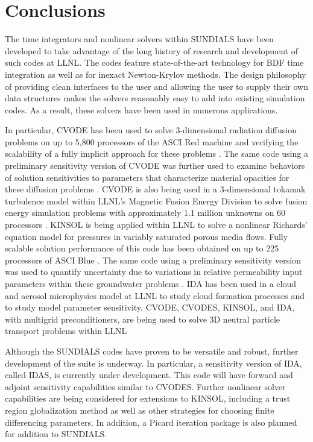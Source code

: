 \section{Conclusions}\label{s:conclusions}

The time integrators and nonlinear solvers within SUNDIALS have been
developed to take advantage of the long history of research and development
of such codes at LLNL.  The codes feature state-of-the-art 
technology for BDF time integration as well as for inexact Newton-Krylov
methods.  The design philosophy of providing clean interfaces to the 
user and allowing the user to supply their own data structures makes the 
solvers reasonably easy to add into existing simulation codes.  As a result,
these solvers have been used in numerous applications.

In particular, CVODE has been used to solve 3-dimensional radiation diffusion
problems on up to 5,800 processors of the ASCI Red machine and
verifying the scalability 
of a fully implicit approach for these problems \cite{BrWo:01}.
The same code using a preliminary sensitivity version of CVODE was 
further used to examine behaviors of solution sensitivities to 
parameters that characterize material opacities for these
diffusion problems \cite{LWG:03,LHB:00}.  CVODE is also being used in a 
3-dimensional tokamak turbulence model within LLNL's 
Magnetic Fusion Energy Division to solve fusion energy simulation problems
with approximately 1.1 million unknowns on 60 processors \cite{RXH:02}.
KINSOL is being applied within
LLNL to solve a nonlinear Richards' equation model for pressures in
variably saturated porous media flows.  
Fully scalable solution performance of this code has been obtained on
up to 225 processors of ASCI Blue \cite{JoWo:01,Woo:98}.  The same code using 
a preliminary sensitivity version was used to quantify
uncertainty due to variations in relative permeability input parameters
within these groundwater problems \cite{WGM:02}.
IDA has been used in a cloud and aerosol microphysics
model at LLNL to study cloud formation processes and to study model
parameter sensitivity.
CVODE, CVODES, KINSOL, and IDA, with multigrid preconditioners, 
are being used to
solve 3D neutral particle transport problems within LLNL

Although the SUNDIALS codes have proven to be 
versatile and robust, 
further development of the suite is underway.  
In particular, a sensitivity version of IDA, called IDAS, is 
currently under development.  This code will have forward and adjoint
sensitivity capabilities similar to CVODES.  Further nonlinear solver
capabilities are being considered for extensions to KINSOL, including 
a trust region globalization method as well as other strategies for
choosing finite differencing parameters.  In addition, a Picard iteration 
package is also planned for addition to SUNDIALS.  



